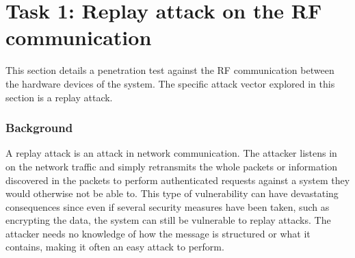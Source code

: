 \section{Task 1: Replay attack on the RF communication} \label{ch:pentesting:replay}
This section details a penetration test against the RF communication between the hardware devices of the system. The specific attack vector explored in this section is a replay attack.

\subsubsection{Background}
A replay attack is an attack in network communication. The attacker listens in on the network traffic and simply retransmits the whole packets or information discovered in the packets to perform authenticated requests against a system they would otherwise not be able to. This type of vulnerability can have devastating consequences since even if several security measures have been taken, such as encrypting the data, the system can still be vulnerable to replay attacks. The attacker needs no knowledge of how the message is structured or what it contains, making it often an easy attack to perform.


